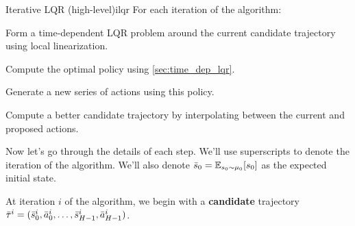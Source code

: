\documentclass[\main/main]{subfiles}
\begin{document}
\begin{definition}{Iterative LQR (high-level)}{ilqr}
    For each iteration of the algorithm:
    \begin{steps}
        \item Form a time-dependent LQR problem around the current candidate trajectory using local linearization.
        \item Compute the optimal policy using \autoref{sec:time_dep_lqr}.
        \item Generate a new series of actions using this policy.
        \item Compute a better candidate trajectory by interpolating between the current and proposed actions.
    \end{steps}
\end{definition}

Now let's go through the details of each step. We'll use superscripts to denote the iteration of the algorithm. We'll also denote $\bar {s}_0 = \operatorname*{\mathbb{E}}_{s_0 \sim \mu_0} [s_0]$ as the expected initial state.

At iteration $i$ of the algorithm, we begin with a \textbf{candidate} trajectory $\bar \tau^i = (\bar {s}^i_0, \bar {a}^i_0, \dots, \bar {s}^i_{H-1}, \bar {a}^i_{H-1})$.
\end{document}

